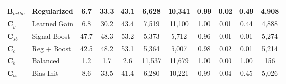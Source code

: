\begin{table}[!t]
{{\begin{tabular}{l l ccc cc cccc}
\textbf{B$_{ortho}$} & Regularized & 6.7 & 33.3 & 43.1 & 6,628 & 10,341 & 0.99 & 0.02 & 0.49 & 4,908 \\
\midrule
\textbf{C$_g$} & Learned Gain & 6.8 & 30.2 & 43.4 & 7,519 & 11,100 & 1.00 & 0.01 & 0.44 & 4,888 \\
\textbf{C$_{sb}$} & Signal Boost & 47.7 & 48.3 & 53.2 & 5,373 & 5,712 & 0.96 & 0.01 & 0.01 & 5,274 \\
\textbf{C$_c$} & Reg + Boost & 42.5 & 48.2 & 53.1 & 5,364 & 6,007 & 0.98 & 0.02 & 0.01 & 5,214 \\
\textbf{C$_b$} & Balanced & 1.2 & 1.7 & 2.6 & 11,537 & 11,679 & 1.00 & 0.00 & 1.00 & 156 \\
\textbf{C$_{bi}$} & Bias Init & 8.6 & 33.5 & 41.4 & 6,280 & 10,221 & 0.99 & 0.04 & 0.45 & 5,026 \\
\bottomrule
\end{tabular}%
}}
\vspace{-0.1in}
\end{table}
